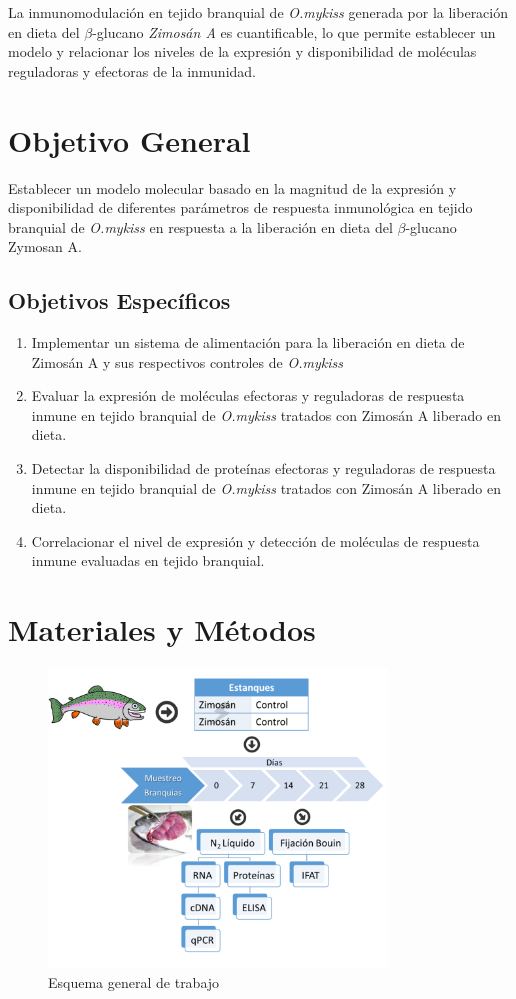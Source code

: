 \documentclass[12pt,letterpaper,oneside]{scrbook}
\begin{document}
La inmunomodulación en tejido branquial de \emph{O.mykiss} generada por
la liberación en dieta del \(\beta\)-glucano \emph{Zimosán A} es
cuantificable, lo que permite establecer un modelo y relacionar los
niveles de la expresión y disponibilidad de moléculas reguladoras y
efectoras de la inmunidad. \chapter{Objetivo General}

Establecer un modelo molecular basado en la magnitud de la expresión y
disponibilidad de diferentes parámetros de respuesta inmunológica en
tejido branquial de \emph{O.mykiss} en respuesta a la liberación en
dieta del \(\beta\)-glucano Zymosan A.

\section{Objetivos Específicos}

\begin{enumerate}
\def\labelenumi{\arabic{enumi}.}
\itemsep1pt\parskip0pt
\item
  Implementar un sistema de alimentación para la liberación en dieta de
  Zimosán A y sus respectivos controles de \emph{O.mykiss}
\item
  Evaluar la expresión de moléculas efectoras y reguladoras de respuesta
  inmune en tejido branquial de \emph{O.mykiss} tratados con Zimosán A
  liberado en dieta.
\item
  Detectar la disponibilidad de proteínas efectoras y reguladoras de
  respuesta inmune en tejido branquial de \emph{O.mykiss} tratados con
  Zimosán A liberado en dieta.
\item
  Correlacionar el nivel de expresión y detección de moléculas de
  respuesta inmune evaluadas en tejido branquial.
\end{enumerate}

\clearpage

\chapter{Materiales y Métodos}

\begin{figure}[h!]
    \centering
    \includegraphics[width=9cm]{esquema} 
    \caption {Esquema general de trabajo}
    \label {fig:esquema}
\end{figure}
\end{document}
